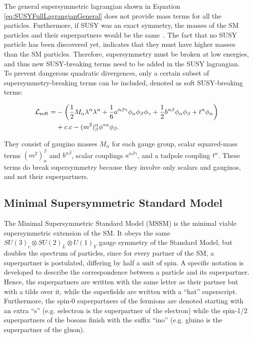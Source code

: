 The general supersymmetric lagrangian shown in Equation \ref{eq:SUSYFullLagrangianGeneral} does not provide mass terms for all the particles.
Furthermore, if SUSY was an exact symmetry, the masses of the SM particles and their superpartners would be the same~\cite{Martin:1997ns}.
The fact that no SUSY particle has been discovered yet, indicates that they must have higher masses than the SM particles.
Therefore, supersymmetry must be broken at low energies, and thus new SUSY-breaking terms need to be added in the SUSY lagrangian.
To prevent dangerous quadratic divergences, only a certain subset of supersymmetry-breaking terms can be included, denoted as soft SUSY-breaking terms:

\begin{equation}
\begin{split}
\lagrangian_\text{soft} = & -\left( \frac{1}{2} M_\alpha \lambda^\alpha \lambda^\alpha + \frac{1}{6}a^{\alpha\beta\gamma}\phi_\alpha \phi_\beta \phi_\gamma + \frac{1}{2}b^{\alpha\beta}\phi_\alpha \phi_\beta + t^\alpha \phi_\alpha \right) \\
&  + c.c - (m^2)^\alpha_\beta \phi^{\ast\alpha} \phi_{\beta}.
\end{split}
\label{eq:SUSYBreakingSoft}
\end{equation}

They consist of gaugino masses $M_\alpha$ for each gauge group, scalar squared-mass terms $(m^2)^{\beta}_{\alpha}$ and $b^{\alpha\beta}$, scalar couplings $a^{\alpha\beta\gamma}$, and a tadpole coupling $t^\alpha$.
These terms do break supersymmetry because they involve only scalars and gauginos, and not their superpartners. 


\subsection{Minimal Supersymmetric Standard Model}

The Minimal Supersymmetric Standard Model (MSSM) is the minimal viable supersymmetric extension of the SM.
It obeys the same $SU(3)_{c}\otimes SU(2)_{L}\otimes U(1)_{Y}$ gauge symmetry of the Standard Model, but doubles the spectrum of particles, since for every partner of the SM, a superpartner is postulated, differing by half a unit of spin.
A specific notation is developed to describe the correspondence between a particle and its superpartner.
Hence, the superpartners are written with the same letter as their partner but with a tilde over it, while the superfields are written with a ``hat'' superscript.
Furthermore, the spin-0 superpartners of the fermions are denoted starting with an extra ``s'' (e.g. selectron is the superpartner of the electron) while the spin-1/2 superpartners of the bosons finish with the suffix ``ino'' (e.g. gluino is the superpartner of the gluon).

